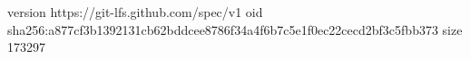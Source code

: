 version https://git-lfs.github.com/spec/v1
oid sha256:a877cf3b1392131cb62bddcee8786f34a4f6b7c5e1f0ec22cecd2bf3c5fbb373
size 173297
